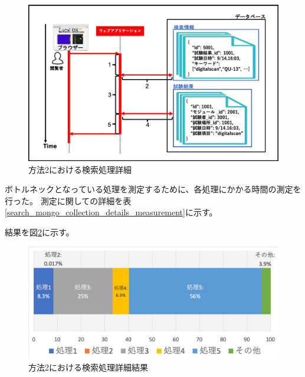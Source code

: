 \begin{figure}[bpt]
  \begin{center}
    \includegraphics[width=14cm]{search_mongo_collection_details}
  \caption[方法2における検索処理詳細]{方法2における検索処理詳細}
  \label{search_mongo_collection_details}
  \end{center}
\end{figure}

ボトルネックとなっている処理を測定するために、各処理にかかる時間の測定を行った。
測定に関しての詳細を表\ref{search_mongo_collection_details_measurement}に示す。

\begin{table}[tbp]
\begin{center}
\caption[検索機能処理時間測定の詳細]{検索機能処理時間測定の詳細}
\label{search_mongo_collection_details_measurement}
\end{center}
\end{table}

結果を図\ref{search_mongo_collection_details_result}に示す。

\begin{figure}[bpt]
  \begin{center}
    \includegraphics[width=14cm]{search_mongo_collection_details_result}
  \caption[方法2における検索処理詳細結果]{方法2における検索処理詳細結果}
  \label{search_mongo_collection_details_result}
  \end{center}
\end{figure}

